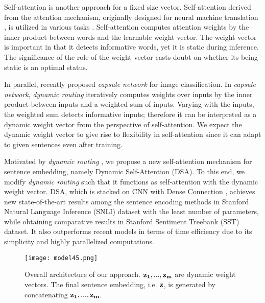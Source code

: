 \documentclass[11pt,a4paper]{article}
\begin{document}
Self-attention is another approach for a fixed size vector. Self-attention derived from the attention mechanism, originally designed for neural machine translation \cite{seqtoseqattention}, is utilized in various tasks \cite{Yang,hierarchical,varioustasks}. Self-attention computes attention weights by the inner product between words and the learnable weight vector. The weight vector is important in that it detects informative words, yet it is static during inference. The significance of the role of the weight vector casts doubt on whether its being static is an optimal status.




In parallel, \citet{capsule} recently proposed \textit{capsule network} for image classification. In \textit{capsule network}, \textit{dynamic routing} iteratively computes weights over inputs by the inner product between inputs and a weighted sum of inputs. Varying with the inputs, the weighted sum detects informative inputs; therefore it can be interpreted as a dynamic weight vector from the perspective of self-attention. We expect the dynamic weight vector to give rise to flexibility in self-attention since it can adapt to given sentences even after training.






Motivated by \textit{dynamic routing} \cite{capsule}, we propose a new self-attention mechanism for sentence embedding, namely Dynamic Self-Attention (DSA). To this end, we modify \textit{dynamic routing} such that it functions as self-attention with the dynamic weight vector. DSA, which is stacked on CNN with Dense Connection \cite{dense}, achieves new state-of-the-art results among the sentence encoding methods in Stanford Natural Language Inference (SNLI) dataset with the least number of parameters, while obtaining comparative results in Stanford Sentiment Treebank (SST) dataset. It also outperforms recent models in terms of time efficiency due to its simplicity and highly parallelized computations. 

















\begin{figure*}
        \centering
        \texttt{[image: model45.png]}
        \caption{Overall architecture of our approach. ${\bf z_1, ..., z_m}$ are dynamic weight vectors. The final sentence embedding, i.e. $\bf z$, is generated by concatenating ${\bf z_1, ..., z_m}$.}\label{fig:model}
\end{figure*}
\end{document}
